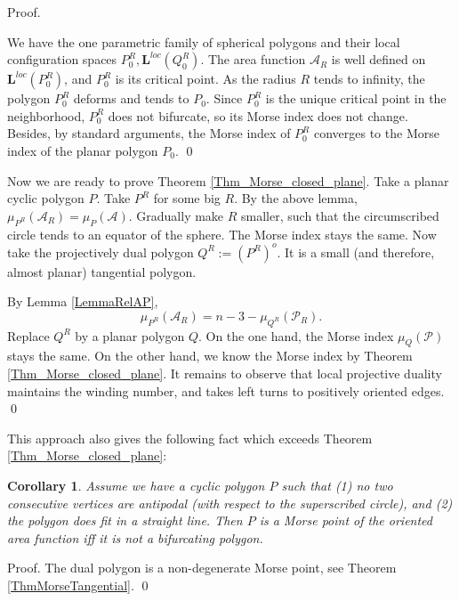 \documentclass[12pt]{amsart}
\theoremstyle{plain}
\newtheorem{corollary}{Corollary}
\theoremstyle{definition}
\theoremstyle{remark}
\theoremstyle{plain}
\theoremstyle{definition}
\begin{document}
 {Proof.
\begin{comment} keeps all the angles of the polygon except for the two last ones, and $\phi$ keeps the edge lengths except for the last one.

Then in the neighborhood $U(Q_0)$, one has  $\mathcal{P}(\phi(Q))=\mathcal{P}(Q)+\frac{1}{R}\cdot \mathbf{R}(Q,R)$, where $\mathbf{R}$ and its second derivatives are uniformly bounded.
\end{comment}
We have the one parametric family of spherical polygons and their local configuration spaces $P_0^R,\mathbf{L}^{loc}(Q_0^R)$. The area function $\mathcal{A}_R$  is well defined  on $\mathbf{L}^{loc}(P_0^R)$, and $P_0^R$ is its critical point.   As the radius $R$ tends to infinity, the polygon  $P_0^R$ deforms and tends to $P_0$.  Since $P_0^R$ is  the unique critical point in the neighborhood, $P_0^R$ does not bifurcate, so its Morse index does not change.  Besides, by standard arguments, the Morse index of $P_0^R$  converges to the Morse index of the planar polygon $P_0$. \qed

\bigskip



\bigskip
Now we are ready to prove  Theorem \ref{Thm_Morse_closed_plane}. Take a planar cyclic polygon $P$.
Take $P^R$ for some big $R$.  By the above lemma, $\mu_{P^R}(\mathcal{A}_R)= \mu_{P}(\mathcal{A})$. Gradually make $R$ smaller, such that the circumscribed circle tends to an equator of the sphere. The Morse index stays the same. Now take the projectively dual polygon  $Q^R:=(P^R)^o$. It is a small (and therefore, almost planar) tangential polygon.

By Lemma \ref{LemmaRelAP}, $$\mu_{P^R}(\mathcal{A}_R)=n-3-\mu_{Q^R}(\mathcal{P}_R).$$
Replace  $Q^R$ by a planar polygon $Q$. On the one hand, the Morse index $\mu_{Q}(\mathcal{P})$ stays the same. On the other hand, we know the Morse index by
Theorem \ref{Thm_Morse_closed_plane}. It remains to observe  that
  local  projective duality  maintains the winding number, and
               takes  {left turns} to positively oriented edges.
            \qed

This approach also gives the following fact which exceeds Theorem \ref{Thm_Morse_closed_plane}:
\begin{corollary}\label{RemFinal}
Assume we have a cyclic polygon $P$ such that (1) no two consecutive vertices are antipodal (with respect to the superscribed circle), and (2) the polygon does fit in a straight line. Then
$P$ is a Morse point of the oriented area function iff it is not a bifurcating polygon.
\end{corollary}
Proof. The dual polygon is a non-degenerate Morse point, see Theorem \ref{ThmMorseTangential}. \qed


}
\end{document}
